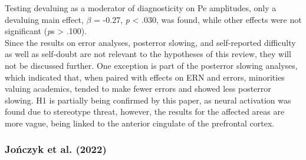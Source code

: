 \documentclass[
  stu,floatsintext]{apa7}
\begin{document}
Testing devaluing as a moderator of diagnosticity on Pe amplitudes, only a devaluing main effect, \(\beta\) = -0.27, \emph{p} \textless{} .030, was found, while other effects were not significant (\emph{p}s \textgreater{} .100).\\
Since the results on error analyses, posterror slowing, and self-reported difficulty as well as self-doubt are not relevant to the hypotheses of this review, they will not be discussed further.
One exception is part of the posterror slowing analyses, which indicated that, when paired with effects on ERN and errors, minorities valuing academics, tended to make fewer errors and showed less posterror slowing.
H1 is partially being confirmed by this paper, as neural activation was found due to stereotype threat, however, the results for the affected areas are more vague, being linked to the anterior cingulate of the prefrontal cortex.

\subsubsection{Jończyk et al. (2022)}\label{jonczykhowstereotypethreat2022}
\end{document}
